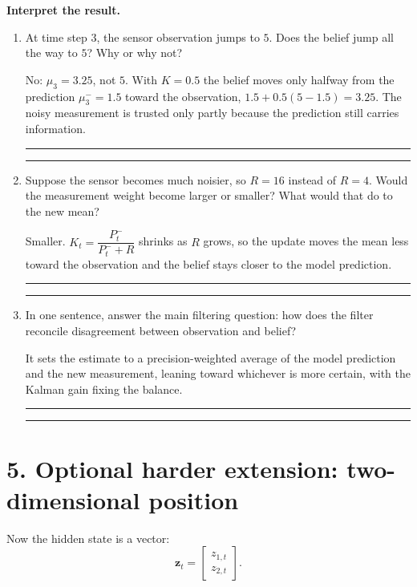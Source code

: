 \documentclass[11pt]{article}
\newcommand{\blankline}{\vspace{0.9em}\hrule\vspace{0.9em}}
\begin{document}
\textbf{Interpret the result.}

\begin{enumerate}
  \item At time step 3, the sensor observation jumps to $5$. Does the belief
  jump all the way to $5$? Why or why not?

  \begin{solution}
  No: $\mu_3=3.25$, not $5$. With $K=0.5$ the belief moves only halfway from the
  prediction $\mu_3^-=1.5$ toward the observation, $1.5+0.5(5-1.5)=3.25$. The
  noisy measurement is trusted only partly because the prediction still carries
  information.
  \end{solution}

  \blankline
  \blankline

  \item Suppose the sensor becomes much noisier, so $R=16$ instead of $R=4$.
  Would the measurement weight become larger or smaller? What would that do to
  the new mean?

  \begin{solution}
  Smaller. $K_t=\dfrac{P_t^-}{P_t^-+R}$ shrinks as $R$ grows, so the update
  moves the mean less toward the observation and the belief stays closer to the
  model prediction.
  \end{solution}

  \blankline
  \blankline

  \item In one sentence, answer the main filtering question: how does the filter
  reconcile disagreement between observation and belief?

  \begin{solution}
  It sets the estimate to a precision-weighted average of the model prediction
  and the new measurement, leaning toward whichever is more certain, with the
  Kalman gain fixing the balance.
  \end{solution}

  \blankline
  \blankline
\end{enumerate}

\newpage

\section*{5. Optional harder extension: two-dimensional position}

Now the hidden state is a vector:
\[
\mathbf{z}_t =
\begin{bmatrix}
z_{1,t} \\
z_{2,t}
\end{bmatrix}.
\]
\end{document}
